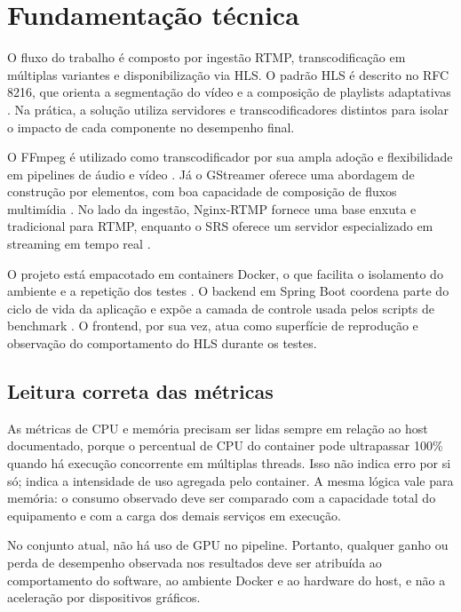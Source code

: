 \section{Fundamentação técnica}

O fluxo do trabalho é composto por ingestão RTMP, transcodificação em múltiplas variantes e disponibilização via HLS. O padrão HLS é descrito no RFC 8216, que orienta a segmentação do vídeo e a composição de playlists adaptativas \cite{rfc8216}. Na prática, a solução utiliza servidores e transcodificadores distintos para isolar o impacto de cada componente no desempenho final.

O FFmpeg é utilizado como transcodificador por sua ampla adoção e flexibilidade em pipelines de áudio e vídeo \cite{ffmpeg-docs}. Já o GStreamer oferece uma abordagem de construção por elementos, com boa capacidade de composição de fluxos multimídia \cite{gstreamer-docs}. No lado da ingestão, Nginx-RTMP fornece uma base enxuta e tradicional para RTMP, enquanto o SRS oferece um servidor especializado em streaming em tempo real \cite{nginx-rtmp-module,srs-docs}.

O projeto está empacotado em containers Docker, o que facilita o isolamento do ambiente e a repetição dos testes \cite{docker-docs}. O backend em Spring Boot coordena parte do ciclo de vida da aplicação e expõe a camada de controle usada pelos scripts de benchmark \cite{spring-boot-docs}. O frontend, por sua vez, atua como superfície de reprodução e observação do comportamento do HLS durante os testes.

\subsection{Leitura correta das métricas}

As métricas de CPU e memória precisam ser lidas sempre em relação ao host documentado, porque o percentual de CPU do container pode ultrapassar 100\% quando há execução concorrente em múltiplas threads. Isso não indica erro por si só; indica a intensidade de uso agregada pelo container. A mesma lógica vale para memória: o consumo observado deve ser comparado com a capacidade total do equipamento e com a carga dos demais serviços em execução.

No conjunto atual, não há uso de GPU no pipeline. Portanto, qualquer ganho ou perda de desempenho observada nos resultados deve ser atribuída ao comportamento do software, ao ambiente Docker e ao hardware do host, e não a aceleração por dispositivos gráficos.